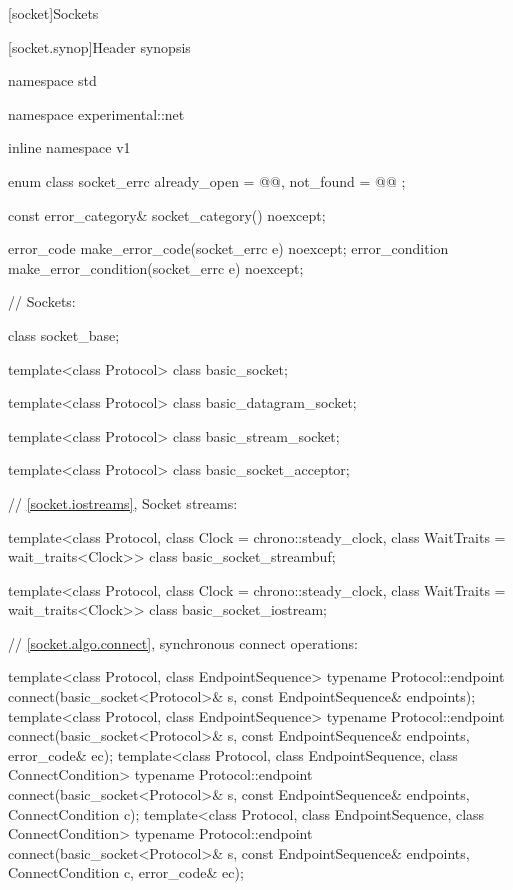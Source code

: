
[socket]{Sockets}


%
[socket.synop]{Header  synopsis}

%
\begin{codeblock}
namespace std {
namespace experimental::net {
inline namespace v1 {

  enum class socket_errc {
    already_open = @@,
    not_found = @@
  };

  const error_category& socket_category() noexcept;

  error_code make_error_code(socket_errc e) noexcept;
  error_condition make_error_condition(socket_errc e) noexcept;

  // Sockets:

  class socket_base;

  template<class Protocol>
    class basic_socket;

  template<class Protocol>
    class basic_datagram_socket;

  template<class Protocol>
    class basic_stream_socket;

  template<class Protocol>
    class basic_socket_acceptor;

  // \ref{socket.iostreams}, Socket streams:

  template<class Protocol, class Clock = chrono::steady_clock,
    class WaitTraits = wait_traits<Clock>>
      class basic_socket_streambuf;

  template<class Protocol, class Clock = chrono::steady_clock,
    class WaitTraits = wait_traits<Clock>>
      class basic_socket_iostream;

  // \ref{socket.algo.connect}, synchronous connect operations:

  template<class Protocol, class EndpointSequence>
    typename Protocol::endpoint connect(basic_socket<Protocol>& s,
                                        const EndpointSequence& endpoints);
  template<class Protocol, class EndpointSequence>
    typename Protocol::endpoint connect(basic_socket<Protocol>& s,
                                        const EndpointSequence& endpoints,
                                        error_code& ec);
  template<class Protocol, class EndpointSequence, class ConnectCondition>
    typename Protocol::endpoint connect(basic_socket<Protocol>& s,
                                        const EndpointSequence& endpoints,
                                        ConnectCondition c);
  template<class Protocol, class EndpointSequence, class ConnectCondition>
    typename Protocol::endpoint connect(basic_socket<Protocol>& s,
                                        const EndpointSequence& endpoints,
                                        ConnectCondition c,
                                        error_code& ec);

}}}
\end{codeblock}
